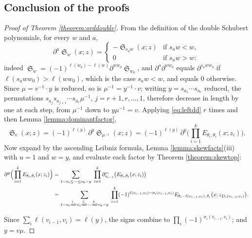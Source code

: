 \documentclass{amsart}
\theoremstyle{definition}
\theoremstyle{remark}
\numberwithin{equation}{section}
\DeclareMathOperator{\sch}{\mathfrak{S}}
\begin{document}
\subsection{Conclusion of the proofs}

\begin{proof}[Proof of Theorem \ref{theorem:orddouble}]
From the definition of the double Schubert polynomials, for every $w$ and $a$,
\begin{equation}\label{eq:leftdd}
\partial^a\sch_w(x;z)=\begin{cases}-\sch_{s_aw}(x;z)&\text{if }s_aw<w,\\ 0&\text{if }s_aw>w:\end{cases}
\end{equation}
indeed $\sch_w=(-1)^{\ell(w_0)-\ell(w)}\partial^{ww_0}\sch_{w_0}$, and $\partial^a\partial^{ww_0}$ equals $\partial^{s_aww_0}$ if $\ell(s_aww_0)>\ell(ww_0)$, which is the case $s_aw<w$, and equals $0$ otherwise. Since $\mu=v^{-1}\cdot y$ is reduced, so is $\mu^{-1}=y^{-1}\cdot v$; writing $y=s_{a_1}\cdots s_{a_r}$ reduced, the permutations $s_{a_j}s_{a_{j+1}}\cdots s_{a_r}\mu^{-1}$, $j=r+1,r,\ldots,1$, therefore decrease in length by one at each step, from $\mu^{-1}$ down to $y\mu^{-1}=v$. Applying \eqref{eq:leftdd} $r$ times and then Lemma \ref{lemma:dominantfactor},
$$\sch_v(x;z)=(-1)^{\ell(y)}\,\partial^{y}\sch_{\mu^{-1}}(x;z)=(-1)^{\ell(y)}\,\partial^{y}\Big(\prod_{i=1}^kE_{\theta_i,\theta_i}(x;z_i)\Big).$$
Now expand by the ascending Leibniz formula, Lemma \ref{lemma:skewfacts}(iii) with $u=1$ and $w=y$, and evaluate each factor by Theorem \ref{theorem:skewtop}:
\begin{align*}
\partial^{y}\Big(\prod_{i=1}^kE_{\theta_i,\theta_i}(x;z_i)\Big)&=\sum_{1=v_0\leq\cdots\leq v_k=y}\ \prod_{i=1}^k\partial^{v_i}_{v_{i-1}}\big(E_{\theta_i,\theta_i}(x;z_i)\big)\\
&=\sum_{1=v_0\Tom{1}v_1\Tom{2}\cdots\Tom{k}v_k=y}\ \prod_{i=1}^k(-1)^{\ell(v_{i-1},v_i)-\sigma_i(v_{i-1},v_i)}E_{\theta_i-\ell(v_{i-1},v_i),\,\theta_i}\big(x;z_{D_i(v_{i-1},v_i)}\big).
\end{align*}
Since $\sum_i\ell(v_{i-1},v_i)=\ell(y)$, the signs combine to $\prod_i(-1)^{\sigma_i(v_{i-1},v_i)}$; and $y=v\mu$.
\end{proof}
\end{document}
